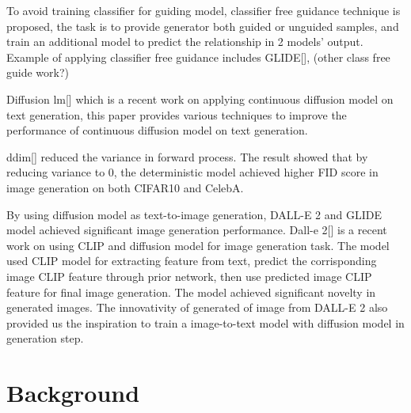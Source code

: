 \documentclass{article}
\begin{document}
To avoid training classifier for guiding model, classifier free guidance technique is proposed, the task is to provide generator both guided or unguided samples, and train an additional model to predict the relationship in 2 models' output. Example of applying classifier free guidance includes GLIDE[], (other class free guide work?)

Diffusion lm[] which is a recent work on applying continuous diffusion model on text generation, this paper provides various techniques to improve the performance of continuous diffusion model on text generation. 

ddim[] reduced the variance in forward process. The result showed that by reducing variance to 0, the deterministic model achieved higher FID score in image generation on both CIFAR10 and CelebA. 

By using diffusion model as text-to-image generation, DALL-E 2 and GLIDE model achieved significant image generation performance. Dall-e 2[] is a recent work on using CLIP and diffusion model for image generation task. The model used CLIP model for extracting feature from text, predict the corrisponding image CLIP feature through prior network, then use predicted image CLIP feature for final image generation. The model achieved significant novelty in generated images. The innovativity of generated of image from DALL-E 2 also provided us the inspiration to train a image-to-text model with diffusion model in generation step. 

\section{Background}
\end{document}
